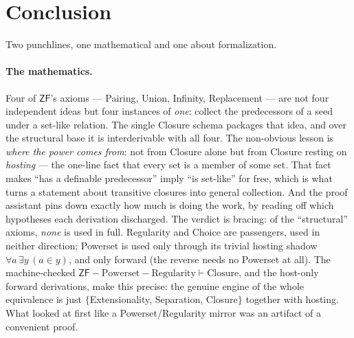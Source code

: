\documentclass[11pt]{article}
\theoremstyle{plain}
\theoremstyle{definition}
\newcommand{\ZF}{\mathsf{ZF}}
\renewcommand{\ZF}{\textsf{ZF}}
\newcommand{\proves}{\vdash}
\begin{document}
\section{Conclusion}\label{sec:conclusion}

Two punchlines, one mathematical and one about formalization.

\paragraph{The mathematics.} Four of $\ZF$'s axioms --- Pairing, Union, Infinity,
Replacement --- are not four independent ideas but four instances of \emph{one}:
collect the predecessors of a seed under a set-like relation. The single Closure
schema packages that idea, and over the structural base it is interderivable with
all four. The non-obvious lesson is \emph{where the power comes from}: not from
Closure alone but from Closure resting on \emph{hosting} --- the one-line fact that
every set is a member of some set. That fact makes ``has a definable predecessor''
imply ``is set-like'' for free, which is what turns a statement about transitive
closures into general collection. And the proof assistant pins down exactly how much
is doing the work, by reading off which hypotheses each derivation discharged. The
verdict is bracing: of the ``structural'' axioms, \emph{none} is used in full.
Regularity and Choice are passengers, used in neither direction; Powerset is used
only through its trivial hosting shadow $\forall a\,\exists y\,(a\in y)$, and only
forward (the reverse needs no Powerset at all). The machine-checked
$\ZF - \text{Powerset} - \text{Regularity} \proves \text{Closure}$, and the
host-only forward derivations, make this precise: the genuine engine of the whole
equivalence is just $\{$Extensionality, Separation, Closure$\}$ together with
hosting. What looked at first like a Powerset/Regularity mirror was an artifact of a
convenient proof.
\end{document}
